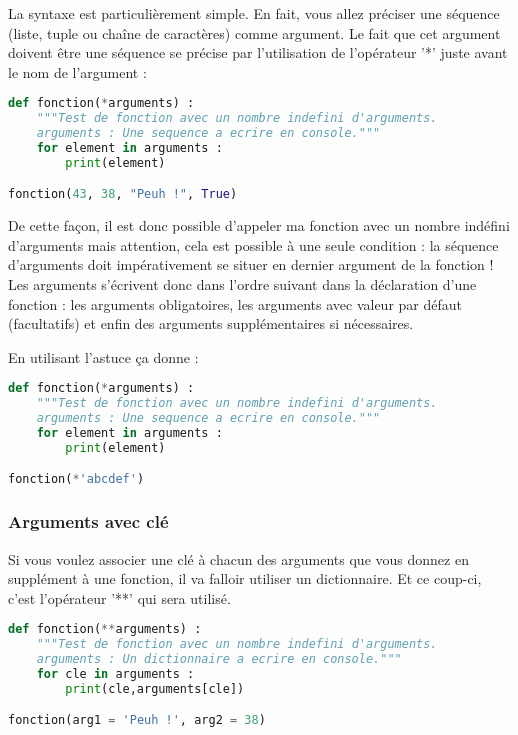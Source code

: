 \documentclass[a4paper,twoside]{article}
\begin{document}
La syntaxe est particulièrement simple. En fait, vous allez préciser une séquence (liste, tuple ou chaîne de caractères) comme argument. Le fait que cet argument doivent être une séquence se précise par l'utilisation de l'opérateur '*' juste avant le nom de l'argument :

\begin{lstlisting}[language=python]
def fonction(*arguments) :
    """Test de fonction avec un nombre indefini d'arguments.
    arguments : Une sequence a ecrire en console."""
    for element in arguments :
        print(element)

fonction(43, 38, "Peuh !", True)
\end{lstlisting}

De cette façon, il est donc possible d'appeler ma fonction avec un nombre indéfini d'arguments mais attention, cela est possible à une seule condition : la séquence d'arguments doit impérativement se situer en dernier argument de la fonction ! Les arguments s'écrivent donc dans l'ordre suivant dans la déclaration d'une fonction : les arguments obligatoires, les arguments avec valeur par défaut (facultatifs) et enfin des arguments supplémentaires si nécessaires.

En utilisant l'astuce  ça donne :
\begin{lstlisting}[language=python]
def fonction(*arguments) :
    """Test de fonction avec un nombre indefini d'arguments.
    arguments : Une sequence a ecrire en console."""
    for element in arguments :
        print(element)

fonction(*'abcdef')
\end{lstlisting}

\subsubsection{Arguments avec clé}

Si vous voulez associer une clé à chacun des arguments que vous donnez en supplément à une fonction, il va falloir utiliser un dictionnaire. Et ce coup-ci, c'est l'opérateur '**' qui sera utilisé.

\begin{lstlisting}[language=python]
def fonction(**arguments) :
    """Test de fonction avec un nombre indefini d'arguments.
    arguments : Un dictionnaire a ecrire en console."""
    for cle in arguments :
        print(cle,arguments[cle])

fonction(arg1 = 'Peuh !', arg2 = 38)
\end{lstlisting}
\end{document}
